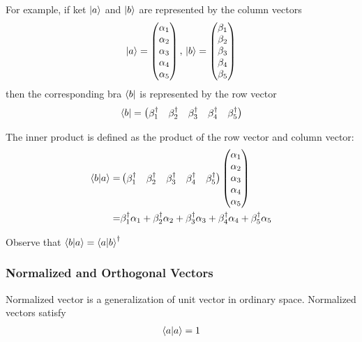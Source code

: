 For example, if ket $\ket{a}$ and $\ket{b}$ are represented by the column vectors
\begin{align*}
    \ket{a}=\begin{pmatrix}
        \alpha_1 \\ \alpha_2\\ \alpha_3\\ \alpha_4 \\ \alpha_5
    \end{pmatrix},\, 
    \ket{b}=\begin{pmatrix}
        \beta_1 \\ \beta_2\\ \beta_3\\ \beta_4 \\ \beta_5
    \end{pmatrix}
\end{align*}
then the corresponding bra $\bra{b}$ is represented by the row vector
\begin{align*}
    \bra{b}=\begin{pmatrix}
        \beta_1^{\dagger}  & \beta_2^{\dagger} & \beta_3^{\dagger} & \beta_4^{\dagger}  & \beta_5^{\dagger}
    \end{pmatrix}
\end{align*}

The inner product is defined as the product of the row
vector and column vector:
\begin{align*}
    \braket{b|a}=&\begin{pmatrix}
        \beta_1^{\dagger}  & \beta_2^{\dagger} & \beta_3^{\dagger} & \beta_4^{\dagger}  & \beta_5^{\dagger}
    \end{pmatrix}\begin{pmatrix}
        \alpha_1 \\ \alpha_2\\ \alpha_3\\ \alpha_4 \\ \alpha_5
    \end{pmatrix}\\
    =& \beta_1^{\dagger} \alpha_1+ \beta_2^{\dagger}\alpha_2+ \beta_3^{\dagger}\alpha_3+ \beta_4^{\dagger} \alpha_4+ \beta_5^{\dagger}\alpha_5
\end{align*}

Observe that $\braket{b|a}=\braket{a|b}^{\dagger}$


\subsubsection{Normalized and Orthogonal Vectors}
Normalized vector is a generalization of unit vector in ordinary space. Normalized vectors satisfy
\begin{align*}
    \braket{a|a}=1
\end{align*}

